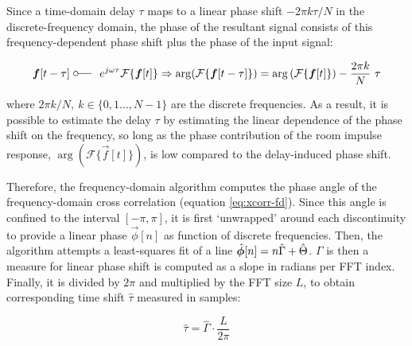 \documentclass[a4paper, notitlepage]{report}
\begin{document}
Since a time-domain delay $\tau$ maps to a linear phase shift $-2\pi k\tau/N$ in the discrete-frequency domain, the phase of the resultant signal consists of this frequency-dependent phase shift plus the phase of the input signal:

\begin{equation}
\label{eq:rir-influence-fd}
\vec{f}[t - \tau]~\fourier~e^{j \omega \tau} \mathcal{F} \{\vec{f}[t]\} \Rightarrow \arg(\mathcal{F} \{\vec{f}[t - \tau]\}) = \arg \left(\mathcal{F} \{\vec{f}[t]\}\right) - \frac{2\pi k}{N}~\tau
\end{equation}

where $2\pi k/N,~k \in \{0, 1 \dots ,N-1\}$ are the discrete frequencies. As a result, it is possible to estimate the delay $\tau$ by estimating the linear dependence of the phase shift on the frequency, so long as the phase contribution of the room impulse response, $\arg \left(\mathcal{F} \{\vec{f}[t]\}\right)$, is low compared to the delay-induced phase shift.

Therefore, the frequency-domain algorithm computes the phase angle of the frequency-domain cross correlation (equation \ref{eq:xcorr-fd}). Since this angle is confined to the interval $[-\pi, \pi]$, it is first `unwrapped' around each discontinuity to provide a linear phase $\vec{\phi} [n]$ as function of discrete frequencies. Then, the algorithm attempts a least-squares fit of a line $\hat{\bm{\phi}}[n] = n\hat{\Gamma}+\hat{\Theta}$. $\Gamma$ is then a measure for linear phase shift is computed as a slope in radians per FFT index. Finally, it is divided by $2\pi$ and multiplied by the FFT size $L$, to obtain corresponding time shift $\hat{\tau}$ measured in samples:

$$ \hat{\tau} = \hat{\Gamma} \cdot \frac{L}{2\pi} $$
\end{document}
